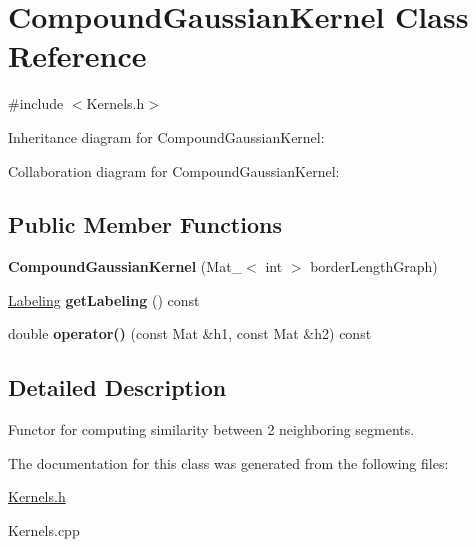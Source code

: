 \hypertarget{class_compound_gaussian_kernel}{\section{Compound\-Gaussian\-Kernel Class Reference}
\label{class_compound_gaussian_kernel}
}


{\ttfamily \#include $<$Kernels.\-h$>$}



Inheritance diagram for Compound\-Gaussian\-Kernel\-:


Collaboration diagram for Compound\-Gaussian\-Kernel\-:
\subsection*{Public Member Functions}
\begin{DoxyCompactItemize}
\item 
\hypertarget{class_compound_gaussian_kernel_a80ac72a581fc6529e5bfbba338d5b2a3}{{\bfseries Compound\-Gaussian\-Kernel} (Mat\-\_\-$<$ int $>$ border\-Length\-Graph)}\label{class_compound_gaussian_kernel_a80ac72a581fc6529e5bfbba338d5b2a3}

\item 
\hypertarget{class_compound_gaussian_kernel_a9b00cb12652f0062505d2bc9d693f22c}{\hyperlink{_graph_partitions_8h_aec5dc4d7252a04b7888874cd64e02e78}{Labeling} {\bfseries get\-Labeling} () const }\label{class_compound_gaussian_kernel_a9b00cb12652f0062505d2bc9d693f22c}

\item 
\hypertarget{class_compound_gaussian_kernel_ab504aa896768f07814d9c89959cff2f5}{double {\bfseries operator()} (const Mat \&h1, const Mat \&h2) const }\label{class_compound_gaussian_kernel_ab504aa896768f07814d9c89959cff2f5}

\end{DoxyCompactItemize}


\subsection{Detailed Description}
Functor for computing similarity between 2 neighboring segments. 

The documentation for this class was generated from the following files\-:\begin{DoxyCompactItemize}
\item 
\hyperlink{_kernels_8h}{Kernels.\-h}\item 
Kernels.\-cpp\end{DoxyCompactItemize}
